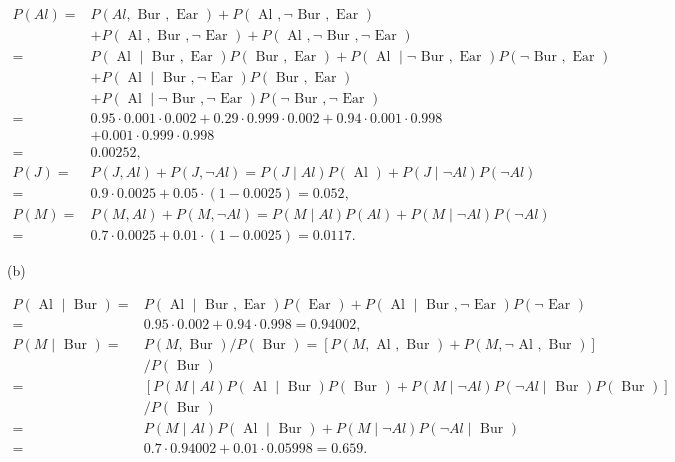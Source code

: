 \documentclass[10pt]{article}
\begin{document}
$$
\begin{aligned}
P(A l)= & P(A l, \text { Bur }, \text { Ear })+P(\text { Al }, \neg \text { Bur }, \text { Ear }) \\
& +P(\text { Al }, \text { Bur }, \neg \text { Ear })+P(\text { Al }, \neg \text { Bur }, \neg \text { Ear }) \\
= & P(\text { Al } \mid \text { Bur }, \text { Ear }) P(\text { Bur }, \text { Ear })+P(\text { Al } \mid \neg \text { Bur }, \text { Ear }) P(\neg \text { Bur }, \text { Ear }) \\
& +P(\text { Al } \mid \text { Bur }, \neg \text { Ear }) P(\text { Bur }, \text { Ear }) \\
& +P(\text { Al } \mid \neg \text { Bur }, \neg \text { Ear }) P(\neg \text { Bur }, \neg \text { Ear }) \\
= & 0.95 \cdot 0.001 \cdot 0.002+0.29 \cdot 0.999 \cdot 0.002+0.94 \cdot 0.001 \cdot 0.998 \\
& +0.001 \cdot 0.999 \cdot 0.998 \\
= & 0.00252, \\
P(J)= & P(J, A l)+P(J, \neg A l)=P(J \mid A l) P(\text { Al })+P(J \mid \neg A l) P(\neg A l) \\
= & 0.9 \cdot 0.0025+0.05 \cdot(1-0.0025)=0.052, \\
P(M)= & P(M, A l)+P(M, \neg A l)=P(M \mid A l) P(A l)+P(M \mid \neg A l) P(\neg A l) \\
= & 0.7 \cdot 0.0025+0.01 \cdot(1-0.0025)=0.0117 .
\end{aligned}
$$

(b)

$$
\begin{aligned}
P(\text { Al } \mid \text { Bur })= & P(\text { Al } \mid \text { Bur }, \text { Ear }) P(\text { Ear })+P(\text { Al } \mid \text { Bur }, \neg \text { Ear }) P(\neg \text { Ear }) \\
= & 0.95 \cdot 0.002+0.94 \cdot 0.998=0.94002, \\
P(M \mid \text { Bur })= & P(M, \text { Bur }) / P(\text { Bur })=[P(M, \text { Al }, \text { Bur })+P(M, \neg \text { Al }, \text { Bur })] \\
& / P(\text { Bur }) \\
= & {[P(M \mid A l) P(\text { Al } \mid \text { Bur }) P(\text { Bur })+P(M \mid \neg A l) P(\neg A l \mid \text { Bur }) P(\text { Bur })] } \\
& / P(\text { Bur }) \\
= & P(M \mid A l) P(\text { Al } \mid \text { Bur })+P(M \mid \neg A l) P(\neg A l \mid \text { Bur }) \\
= & 0.7 \cdot 0.94002+0.01 \cdot 0.05998=0.659 .
\end{aligned}
$$
\end{document}
